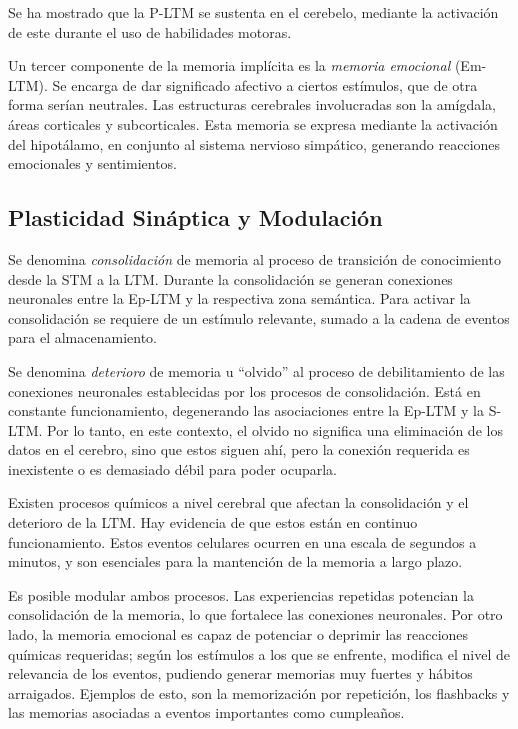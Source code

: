 Se ha mostrado que la P-LTM se sustenta en el cerebelo, mediante la activación de este durante el uso de habilidades motoras.

Un tercer componente de la memoria implícita es la \textit{memoria emocional} (Em-LTM). Se encarga de dar significado afectivo a ciertos  estímulos, que de otra forma serían neutrales. Las estructuras cerebrales involucradas son la amígdala, áreas corticales y subcorticales. Esta memoria se expresa mediante la activación del hipotálamo, en conjunto al sistema nervioso simpático, generando reacciones emocionales y sentimientos.


\subsection{Plasticidad Sináptica y Modulación}

Se denomina \textit{consolidación} de memoria al proceso de transición de conocimiento desde la STM a la LTM. Durante la consolidación se generan conexiones neuronales entre la Ep-LTM y la respectiva zona semántica. Para activar la consolidación se requiere de un estímulo relevante, sumado a la cadena de eventos para el almacenamiento.

Se denomina \textit{deterioro} de memoria u ``olvido'' al proceso de debilitamiento de las conexiones neuronales establecidas por los procesos de consolidación. Está en constante funcionamiento, degenerando las asociaciones entre la Ep-LTM y la S-LTM. Por lo tanto, en este contexto, el olvido no significa una eliminación de los datos en el cerebro, sino que estos siguen ahí, pero la conexión requerida es inexistente o es demasiado débil para poder ocuparla.

Existen procesos químicos a nivel cerebral que afectan la consolidación y el deterioro de la LTM. Hay evidencia de que estos están en continuo funcionamiento. Estos eventos celulares ocurren en una escala de segundos a minutos, y son esenciales para la mantención de la memoria a largo plazo.

Es posible modular ambos procesos. Las experiencias repetidas potencian la consolidación de la memoria, lo que fortalece las conexiones neuronales. Por otro lado, la memoria emocional es capaz de potenciar o deprimir las reacciones químicas requeridas; según los estímulos a los que se enfrente, modifica el nivel de relevancia de los eventos, pudiendo generar memorias muy fuertes y hábitos arraigados. Ejemplos de esto, son la memorización por repetición, los flashbacks y las memorias asociadas a eventos importantes como cumpleaños.

